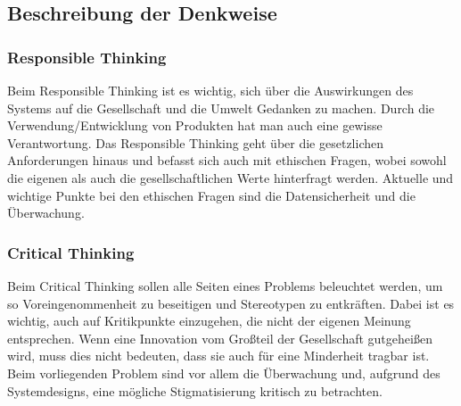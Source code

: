 
\subsection{Beschreibung der Denkweise}
\subsubsection{\textbf{Responsible Thinking}}  
Beim Responsible Thinking\cite{slidesResp} ist es wichtig, sich über die Auswirkungen des Systems auf die Gesellschaft und die Umwelt Gedanken zu machen. Durch die Verwendung/Entwicklung von Produkten hat man auch eine gewisse Verantwortung. Das Responsible Thinking geht über die gesetzlichen Anforderungen hinaus und befasst sich auch mit ethischen Fragen, wobei sowohl die eigenen als auch die gesellschaftlichen Werte hinterfragt werden. Aktuelle und wichtige Punkte bei den ethischen Fragen sind die Datensicherheit und die Überwachung. 
\\
\subsubsection{\textbf{Critical Thinking}}  
Beim Critical Thinking\cite{slidesCritical} sollen alle Seiten eines Problems beleuchtet werden, um so Voreingenommenheit zu beseitigen und Stereotypen zu entkräften. Dabei ist es wichtig, auch auf Kritikpunkte einzugehen, die nicht der eigenen Meinung entsprechen. Wenn eine Innovation vom Großteil der Gesellschaft gutgeheißen wird, muss dies nicht bedeuten, dass sie auch für eine Minderheit tragbar ist. Beim vorliegenden Problem sind vor allem die Überwachung und, aufgrund des Systemdesigns, eine mögliche Stigmatisierung kritisch zu betrachten. 

